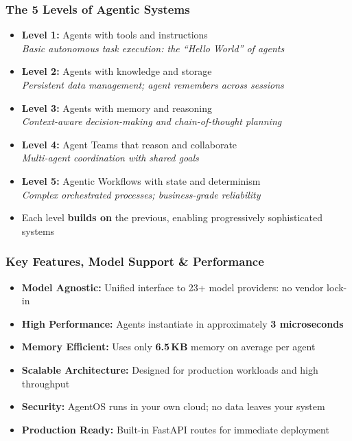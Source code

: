 \begin{frame}[fragile]\frametitle{The 5 Levels of Agentic Systems}
      \begin{itemize}
        \item \textbf{Level 1:} Agents with tools and instructions
              \\ \textit{Basic autonomous task execution: the ``Hello World'' of agents}
        \item \textbf{Level 2:} Agents with knowledge and storage
              \\ \textit{Persistent data management; agent remembers across sessions}
        \item \textbf{Level 3:} Agents with memory and reasoning
              \\ \textit{Context-aware decision-making and chain-of-thought planning}
        \item \textbf{Level 4:} Agent Teams that reason and collaborate
              \\ \textit{Multi-agent coordination with shared goals}
        \item \textbf{Level 5:} Agentic Workflows with state and determinism
              \\ \textit{Complex orchestrated processes; business-grade reliability}
        \item Each level \textbf{builds on} the previous, enabling progressively sophisticated systems
      \end{itemize}
\end{frame}

\begin{frame}[fragile]\frametitle{Key Features, Model Support \& Performance}
      \begin{itemize}
        \item \textbf{Model Agnostic:} Unified interface to 23+ model providers: no vendor lock-in
        \item \textbf{High Performance:} Agents instantiate in approximately \textbf{3 microseconds}
        \item \textbf{Memory Efficient:} Uses only \textbf{6.5\,KB} memory on average per agent
        \item \textbf{Scalable Architecture:} Designed for production workloads and high throughput
        \item \textbf{Security:} AgentOS runs in your own cloud; no data leaves your system
        \item \textbf{Production Ready:} Built-in FastAPI routes for immediate deployment
      \end{itemize}
\end{frame}

